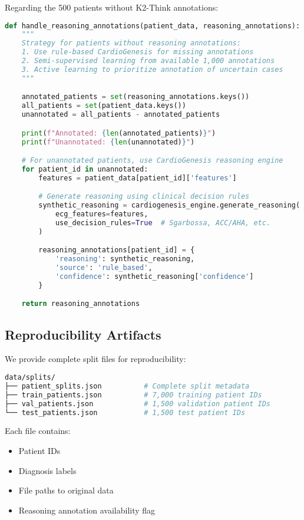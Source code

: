 \documentclass[11pt]{article}
\begin{document}
Regarding the 500 patients without K2-Think annotations:

\begin{lstlisting}[language=Python, caption=Handling Missing Reasoning Annotations]
def handle_reasoning_annotations(patient_data, reasoning_annotations):
    """
    Strategy for patients without reasoning annotations:
    1. Use rule-based CardioGenesis for missing annotations
    2. Semi-supervised learning from available 1,000 annotations
    3. Active learning to prioritize annotation of uncertain cases
    """

    annotated_patients = set(reasoning_annotations.keys())
    all_patients = set(patient_data.keys())
    unannotated = all_patients - annotated_patients

    print(f"Annotated: {len(annotated_patients)}")
    print(f"Unannotated: {len(unannotated)}")

    # For unannotated patients, use CardioGenesis reasoning engine
    for patient_id in unannotated:
        features = patient_data[patient_id]['features']

        # Generate reasoning using clinical decision rules
        synthetic_reasoning = cardiogenesis_engine.generate_reasoning(
            ecg_features=features,
            use_decision_rules=True  # Sgarbossa, ACC/AHA, etc.
        )

        reasoning_annotations[patient_id] = {
            'reasoning': synthetic_reasoning,
            'source': 'rule_based',
            'confidence': synthetic_reasoning['confidence']
        }

    return reasoning_annotations
\end{lstlisting}

\subsection{Reproducibility Artifacts}

We provide complete split files for reproducibility:

\begin{lstlisting}[language=bash, caption=Provided Split Files]
data/splits/
├── patient_splits.json          # Complete split metadata
├── train_patients.json          # 7,000 training patient IDs
├── val_patients.json            # 1,500 validation patient IDs
└── test_patients.json           # 1,500 test patient IDs
\end{lstlisting}

Each file contains:
\begin{itemize}
    \item Patient IDs
    \item Diagnosis labels
    \item File paths to original data
    \item Reasoning annotation availability flag
\end{itemize}
\end{document}
